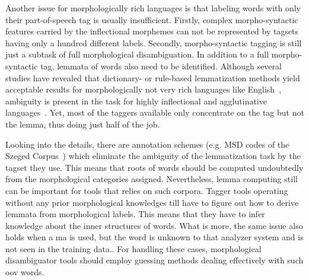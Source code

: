 Another issue for morphologically rich languages is that labeling words with only their part-of-speech tag is usually insufficient. 
Firstly, complex morpho-syntactic features carried by the inflectional morphemes can not be represented by tagsets having only a hundred different labels. 
Secondly, morpho-syntactic tagging is still just a subtask of full morphological disambiguation. 
In addition to a full morpho-syntactic tag, lemmata of words also need to be identified. Although several studies have revealed that dictionary- or rule-based lemmatization methods yield acceptable results for morphologically not very rich languages like English~\cite{Porter1980,Plisson2004}, ambiguity is present in the task for highly inflectional and agglutinative languages~\cite{Jursic2007,Sak2007,Chrupaa2008}. 
Yet, most of the taggers available only concentrate on the tag but not the lemma, thus doing just half of the job.

Looking into the details, there are annotation schemes (e.g. MSD codes of the Szeged Corpus~\cite{Csendes2004}) which eliminate the ambiguity of the lemmatization task by the tagset they use.
This means that roots of words should be computed undoubtedly from the morphological categories assigned.
Nevertheless, lemma computing still can be important for tools that relies on such corpora.
Tagger tools operating without any prior morphological knowledges till  have to figure out how to derive lemmata from morphological labels.
This means that they have to infer knowledge about the inner structures of words.
What is more, the same issue also holds when a \acrshort{ma} is used, but the word is unknown to that analyzer system and is not seen in the training data..
For handling these cases, morphological disambiguator tools should employ guessing methods dealing effectively with such \acrlong{oov} words.

